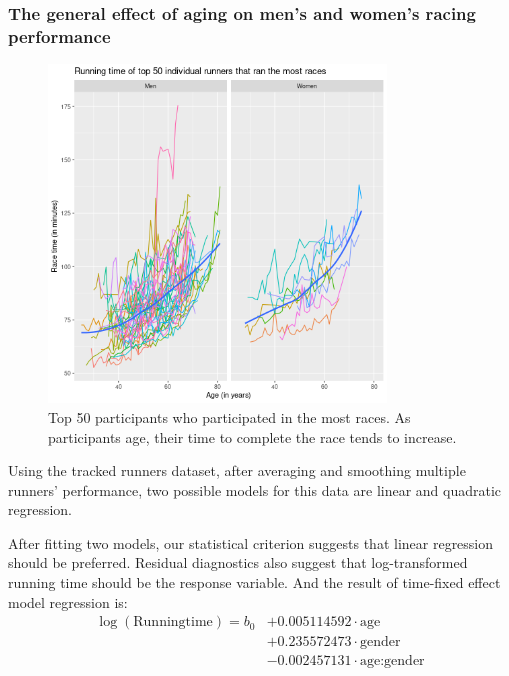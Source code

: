 \documentclass[12pt]{article}
\begin{document}
\subsubsection*{The general effect of aging on
	men's and women's racing performance}

\begin{figure}[ht]
	\centering
	\includegraphics[width = 0.8\textwidth]
	{../figure/overview_tracked_runners-4.png}
	\caption{
		Top 50 participants who participated in the most races.
		As participants age, their time to complete the race
		tends to increase.
	}
	\label{tracked-runners-smooth}
\end{figure}

Using the tracked runners dataset, after averaging and smoothing multiple
runners' performance, two possible models for this data are linear and
quadratic regression.

After fitting two models, our statistical criterion suggests that linear
regression should be preferred.
Residual diagnostics also suggest that log-transformed running time should
be the response variable.
And the result of time-fixed effect model regression is:
\begin{align*}
	\log(\text{Runningtime})
	= b_0 &+ 0.005114592 \cdot \text{age}
	\\&
	+ 0.235572473 \cdot \text{gender}
	\\&
	- 0.002457131 \cdot \text{age:gender}
\end{align*}
\end{document}
